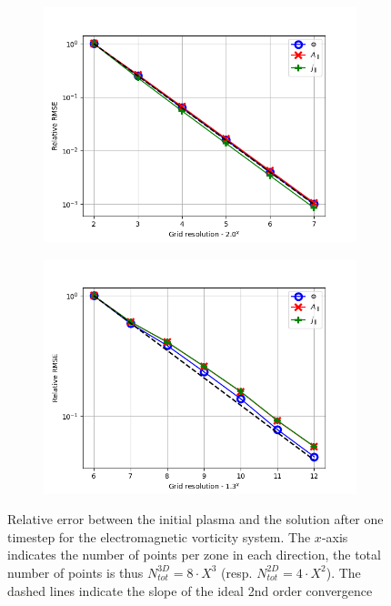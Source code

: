 \begin{figure}[H]
	\centering
	\begin{subfigure}[b]{0.49\textwidth}
		\centering
		\includegraphics[width=1\textwidth]{schemes/err_rel_vortAParaJParaSystem_grid1_2D.png}
		\label{fig:MMSTorturedVortAPara2DConvergence}
	\end{subfigure}
	\begin{subfigure}[b]{0.49\textwidth}
		\centering
		\includegraphics[width=1\textwidth]{schemes/err_rel_vortAParaJParaSystem_grid2_3D.png}
		\label{fig:MMSTorturedVortAPara3DConvergence}
	\end{subfigure}
	\caption[Relative error between the initial plasma and the solution after one timestep for the electromagnetic vorticity system]{Relative error between the initial plasma and the solution after one timestep for the electromagnetic vorticity system. The $x$-axis indicates the number of points per zone in each direction, the total number of points is thus $N_{tot}^{3D} = 8\cdot X^3$ (resp. $N_{tot}^{2D} = 4\cdot X^2$). The dashed lines indicate the slope of the ideal 2nd order convergence}
	\label{fig:MMSTorturedVortAParaConvergence}
\end{figure}


